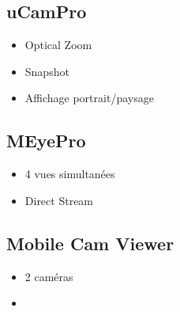\subsection{uCamPro}
\begin{itemize}
  \item Optical Zoom
  \item Snapshot
  \item Affichage portrait/paysage
\end{itemize}

\subsection{MEyePro}
\begin{itemize}
  \item 4 vues simultanées
  \item Direct Stream
\end{itemize}


\subsection{Mobile Cam Viewer}
\begin{itemize}
  \item 2 caméras
  \item
\end{itemize}
\clearpage